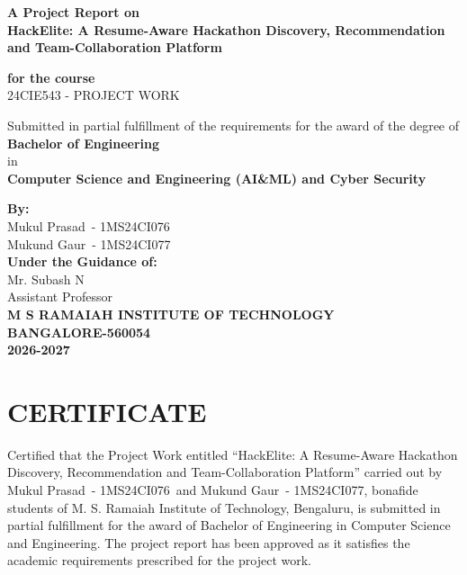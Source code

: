 \documentclass[12pt,a4paper]{report}
\newcommand{\ProjectTitle}{HackElite: A Resume-Aware Hackathon Discovery, Recommendation and Team-Collaboration Platform}
\newcommand{\CourseCode}{24CIE543 - PROJECT WORK}
\newcommand{\AcademicYear}{2026-2027}
\newcommand{\StudentOne}{Mukul Prasad}
\newcommand{\USNOne}{1MS24CI076}
\newcommand{\StudentTwo}{Mukund Gaur}
\newcommand{\USNTwo}{1MS24CI077}
\newcommand{\GuideOne}{Mr. Subash N}
\begin{document}
\begin{titlepage}
\centering
\thispagestyle{fancy}

\vspace*{0.4cm}
{\bfseries\Large A Project Report on\\[0.3cm]}
{\bfseries\LARGE \ProjectTitle \\[0.6cm]}

{\bfseries for the course\\[0.2cm]}
{\CourseCode \\[0.8cm]}

{Submitted in partial fulfillment of the requirements for the award of the degree of\\[0.2cm]}
{\bfseries Bachelor of Engineering\\}
{in\\}
{\bfseries Computer Science and Engineering (AI\&ML) and Cyber Security\\[0.8cm]}

{\bfseries By:\\[0.2cm]}
\StudentOne\ - \USNOne\\
\StudentTwo\ - \USNTwo\\[0.8cm]

{\bfseries Under the Guidance of:\\[0.2cm]}
\GuideOne\\
Assistant Professor\\[1.0cm]

{\bfseries M S RAMAIAH INSTITUTE OF TECHNOLOGY\\}
{\bfseries BANGALORE-560054\\}
{\bfseries \AcademicYear}

\end{titlepage}

\setcounter{page}{1}

\chapter*{CERTIFICATE}

Certified that the Project Work entitled ``\ProjectTitle'' carried out by \StudentOne\ - \USNOne\ and \StudentTwo\ - \USNTwo, bonafide students of M. S. Ramaiah Institute of Technology, Bengaluru, is submitted in partial fulfillment for the award of Bachelor of Engineering in Computer Science and Engineering. The project report has been approved as it satisfies the academic requirements prescribed for the project work.
\end{document}
